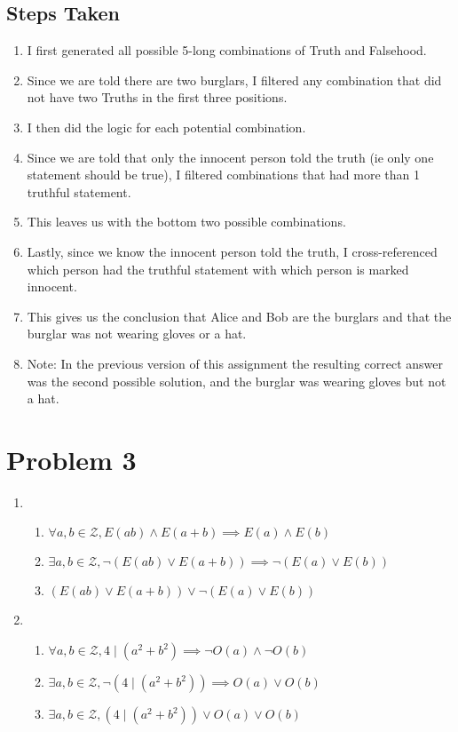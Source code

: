 \documentclass{article}
\begin{document}
\begin{landscape}
    \subsection*{Steps Taken}
    \begin{enumerate}[label=\arabic*.]
        \item I first generated all possible 5-long combinations of Truth and Falsehood.
        \item Since we are told there are two burglars, I filtered any combination that did not have two Truths in the first three positions.
        \item I then did the logic for each potential combination.
        \item Since we are told that only the innocent person told the truth (ie only one statement should be true), I filtered combinations that had more than 1 truthful statement.
        \item This leaves us with the bottom two possible combinations.
        \item Lastly, since we know the innocent person told the truth, I cross-referenced which person had the truthful statement with which person is marked innocent.
        \item This gives us the conclusion that Alice and Bob are the burglars and that the burglar was not wearing gloves or a hat.
        \item Note: In the previous version of this assignment the resulting correct answer was the second possible solution, and the burglar was wearing gloves but not a hat.
    \end{enumerate}
\end{landscape}

\pagebreak

\section*{Problem 3}
\begin{enumerate}[label=\arabic*)]
    \item \begin{enumerate}
              \item \(\forall a,b \in \mathcal{Z}, E(ab) \land E(a+b) \implies E(a) \land E(b)\)
              \item \(\exists a,b \in \mathcal{Z}, \neg (E(ab) \lor E(a+b)) \implies \neg (E(a) \lor E(b))\)
              \item \((E(ab) \lor E(a+b)) \lor \neg (E(a) \lor E(b))\)
          \end{enumerate}
    \item \begin{enumerate}
              \item \(\forall a,b \in \mathcal{Z}, 4 \mid (a^2 + b^2) \implies \neg O(a) \land \neg O(b)\)
              \item \(\exists a,b \in \mathcal{Z}, \neg(4 \mid (a^2 + b^2)) \implies O(a) \lor O(b)\)
              \item \(\exists a,b \in \mathcal{Z}, (4 \mid (a^2 + b^2)) \lor O(a) \lor O(b)\)
          \end{enumerate}
\end{enumerate}
\end{document}
